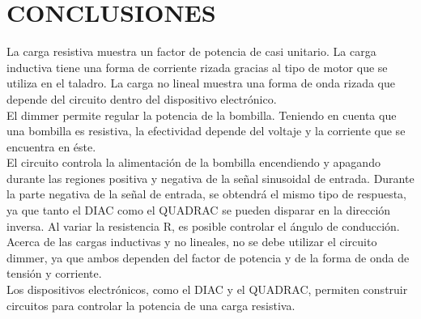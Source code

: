 \documentclass[journal]{IEEEtran}
\begin{document}
\section{CONCLUSIONES}

La carga resistiva muestra un factor de potencia de 
casi unitario. La carga inductiva tiene una forma de 
corriente rizada gracias al tipo de motor que se 
utiliza en el taladro. La carga no lineal muestra 
una forma de onda rizada que depende del circuito 
dentro del dispositivo electrónico. \\

El dimmer permite regular la potencia de la bombilla. 
Teniendo en cuenta que una bombilla es resistiva, la 
efectividad depende del voltaje y la corriente que se 
encuentra en éste. \\

El circuito controla la alimentación de la bombilla 
encendiendo y apagando durante las regiones positiva y 
negativa de la señal sinusoidal de entrada. Durante 
la parte negativa de la señal de entrada, se obtendrá 
el mismo tipo de respuesta, ya que tanto el DIAC como 
el QUADRAC se pueden disparar en la dirección inversa. 
Al variar la resistencia R, es posible controlar el
ángulo de conducción.\\

Acerca de las cargas inductivas y no lineales, no se 
debe utilizar el circuito dimmer, ya que ambos dependen 
del factor de potencia y de la forma de onda de tensión 
y corriente. \\

Los dispositivos electrónicos, como el DIAC y el QUADRAC, 
permiten construir circuitos para controlar la potencia 
de una carga resistiva.

\end{document}
